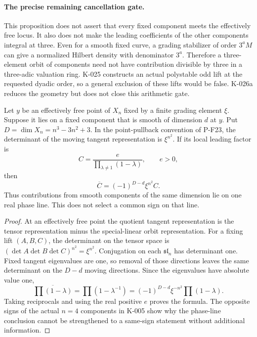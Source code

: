 \paragraph{The precise remaining cancellation gate.}
This proposition does not assert that every fixed component
meets the effectively free locus.  It also does not make the
leading coefficients of the other components integral at three.
Even for a smooth fixed curve, a grading stabilizer of order
$3^aM$ can give a normalized Hilbert density with denominator
$3^a$.  Therefore a three-element orbit of components need not
have contribution divisible by three in a three-adic valuation
ring.  K-025 constructs an actual polystable odd lift at the
requested dyadic order, so a general exclusion of these lifts
would be false.  K-026a reduces the geometry but does not close
this arithmetic gate.

\begin{lemma}
Let $y$ be an effectively free point of $X_n$ fixed by a finite
grading element $\xi$.  Suppose it lies on a fixed component
that is smooth of dimension $d$ at $y$.  Put
$D=\dim X_n=n^3-3n^2+3$.  In the point-pullback convention of
P-F23, the determinant of the moving tangent representation is
$\xi^{n^2}$.  If its local leading factor is
\[
 C=\frac{e}{\prod_{\lambda\ne1}(1-\lambda)},\qquad e>0,
\]
then
\[
                   \overline C=(-1)^{D-d}\xi^{n^2}C.
                                                        \tag{K-026b}
\]
Thus contributions from smooth components of the same dimension
lie on one real phase line.  This does not select a common sign
on that line.
\end{lemma}

\begin{proof}
At an effectively free point the quotient tangent representation
is the tensor representation minus the special-linear orbit
representation.  For a fixing lift $(A,B,C)$, the determinant
on the tensor space is
$(\det A\det B\det C)^{n^2}=\xi^{n^2}$.  Conjugation on each
$\mathfrak{sl}_n$ has determinant one.  Fixed tangent eigenvalues
are one, so removal of those directions leaves the same
determinant on the $D-d$ moving directions.  Since the eigenvalues
have absolute value one,
\[
 \overline{\prod(1-\lambda)}
 =\prod(1-\lambda^{-1})
 =(-1)^{D-d}\xi^{-n^2}\prod(1-\lambda).
\]
Taking reciprocals and using the real positive $e$ proves the
formula.  The opposite signs of the actual $n=4$ components in
K-005 show why the phase-line conclusion cannot be strengthened
to a same-sign statement without additional information.
\end{proof}

